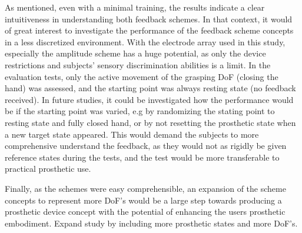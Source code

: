 As mentioned, even with a minimal training, the results indicate a clear intuitiveness in understanding both feedback schemes. In that context, it would of great interest to investigate the performance of the feedback scheme concepts in a less discretized environment. With the electrode array used in this study, especially the amplitude scheme has a huge potential, as only the device restrictions and subjects' sensory discrimination abilities is a limit.
In the evaluation tests, only the active movement of the grasping DoF (closing the hand) was assessed, and the starting point was always resting state (no feedback received). In future studies, it could be investigated how the performance would be if the starting point was varied, e.g by randomizing the stating point to resting state and fully closed hand, or by not resetting the prosthetic state when a new target state appeared. This would demand the subjects to more comprehensive understand the feedback, as they would not as rigidly be given reference states during the tests, and the test would be more transferable to practical prosthetic use.

Finally, as the schemes were easy comprehensible, an expansion of the scheme concepts to represent more DoF's would be a large step towards producing a prosthetic device concept with the potential of enhancing the users prosthetic embodiment. 
Expand study by including more prosthetic states and more DoF’s.



